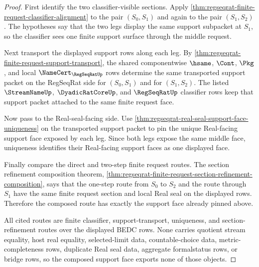 \begin{proof}
First identify the two classifier-visible sections. Apply
\autoref{thm:regseqrat-finite-request-classifier-alignment} to the pair
$(S_0,S_1)$ and again to the pair $(S_1,S_2)$. The hypotheses say that the
two legs display the same support subpacket at $S_1$, so the classifier sees
one finite support surface through the middle request.

Next transport the displayed support rows along each leg. By
\autoref{thm:regseqrat-finite-request-support-transport}, the shared
componentwise $\hsame$, $\Cont$, $\Pkg$, and local
$\NameCert_{\RegSeqRatUp}$ rows determine the same transported support packet
on the RegSeqRat side for $(S_0,S_1)$ and for $(S_1,S_2)$. The listed
$\StreamNameUp$, $\DyadicRatCoreUp$, and $\RegSeqRatUp$ classifier rows keep
that support packet attached to the same finite request face.

Now pass to the Real-seal-facing side. Use
\autoref{thm:regseqrat-real-seal-support-face-uniqueness} on the transported
support packet to pin the unique Real-facing support face exposed by each
leg. Since both legs expose the same middle face, uniqueness identifies their
Real-facing support faces as one displayed face.

Finally compare the direct and two-step finite request routes. The section
refinement composition theorem,
\autoref{thm:regseqrat-finite-request-section-refinement-composition}, says
that the one-step route from $S_0$ to $S_2$ and the route through $S_1$ have
the same finite request section and local Real seal on the displayed rows.
Therefore the composed route has exactly the support face already pinned
above.

All cited routes are finite classifier, support-transport, uniqueness, and
section-refinement routes over the displayed BEDC rows. None carries quotient
stream equality, host real equality, selected-limit data, countable-choice
data, metric-completeness rows, duplicate Real seal data, aggregate
formalstatus rows, or bridge rows, so the composed support face exports none
of those objects.
\end{proof}

